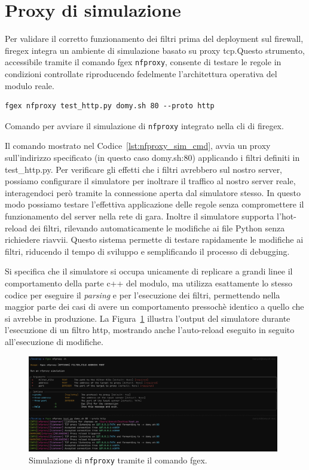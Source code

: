 \section{Proxy di simulazione}

Per validare il corretto funzionamento dei filtri prima del deployment sul firewall, firegex integra un ambiente di simulazione basato su proxy \gls{tcp}.\@ Questo strumento, accessibile tramite il comando fgex \texttt{\gls{nfproxy}}, consente di testare le regole in condizioni controllate riproducendo fedelmente l'architettura operativa del modulo reale.
\begin{listing}[H]
\begin{verbatim}
fgex nfproxy test_http.py domy.sh 80 --proto http
\end{verbatim}
\vspace{-1em}
\caption{Comando per avviare il simulazione di \texttt{nfproxy} integrato nella \gls{cli} di firegex.}\label{lst:nfproxy_sim_cmd}
\end{listing}

Il comando mostrato nel Codice~\ref{lst:nfproxy_sim_cmd}, avvia un proxy sull'indirizzo specificato (in questo caso domy.sh:80) applicando i filtri definiti in test\_http.py.
Per verificare gli effetti che i filtri avrebbero sul nostro server, possiamo configurare il simulatore per inoltrare il traffico al nostro server reale, interagendoci però tramite la connessione aperta dal simulatore stesso. In questo modo possiamo testare l'effettiva applicazione delle regole senza compromettere il funzionamento del server nella rete di gara.
Inoltre il simulatore supporta l'hot-reload dei filtri, rilevando automaticamente le modifiche ai file Python senza richiedere riavvii. Questo sistema permette di testare rapidamente le modifiche ai filtri, riducendo il tempo di sviluppo e semplificando il processo di debugging.

Si specifica che il simulatore si occupa unicamente di replicare a grandi linee il comportamento della parte c++ del modulo, ma utilizza esattamente lo stesso codice per eseguire il \textit{parsing} e per l'esecuzione dei filtri, permettendo nella maggior parte dei casi di avere un comportamento pressochè identico a quello che si avrebbe in produzione.
La Figura~\ref{fig:nfproxy_sim} illustra l'output del simulatore durante l'esecuzione di un filtro \gls{http}, mostrando anche l'auto-reload eseguito in seguito all'esecuzione di modifiche.

\begin{figure}[H]
    \centering
    \includegraphics[width=0.98\textwidth]{images/chapter3/nfproxy_sim.png}
    \caption{Simulazione di \texttt{\gls{nfproxy}} tramite il comando fgex.}\label{fig:nfproxy_sim}
\end{figure}
